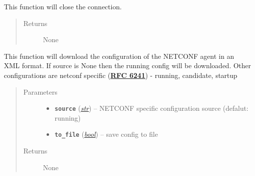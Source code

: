 \documentclass[letterpaper,10pt,english]{sphinxmanual}
\begin{document}
\begin{fulllineitems}
\begin{fulllineitems}
\begin{quote}
\begin{description}
\end{description}\end{quote}

\end{fulllineitems}


\begin{fulllineitems}
\label{util/netconf:escape.util.netconf.AbstractNETCONFAdapter.disconnect}
This function will close the connection.
\begin{quote}\begin{description}
\item[{Returns}] \leavevmode
None

\end{description}\end{quote}

\end{fulllineitems}


\begin{fulllineitems}
\label{util/netconf:escape.util.netconf.AbstractNETCONFAdapter.get_config}
This function will download the configuration of the NETCONF agent in an
XML format. If source is None then the running config will be downloaded.
Other configurations are netconf specific (\href{https://tools.ietf.org/html/rfc6241.html}{\textbf{RFC 6241}}) - running,
candidate, startup
\begin{quote}\begin{description}
\item[{Parameters}] \leavevmode\begin{itemize}
\item {} 
\textbf{\texttt{source}} (\href{https://docs.python.org/2.7/library/functions.html\#str}{\emph{str}}) -- NETCONF specific configuration source (defalut: running)

\item {} 
\textbf{\texttt{to\_file}} (\href{https://docs.python.org/2.7/library/functions.html\#bool}{\emph{bool}}) -- save config to file

\end{itemize}

\item[{Returns}] \leavevmode
None


\end{description}
\end{quote}
\end{fulllineitems}
\end{fulllineitems}
\end{document}
